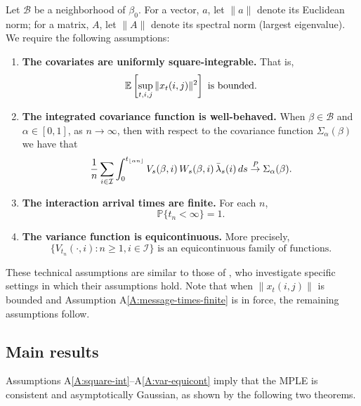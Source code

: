 \documentclass[final]{statsoc}
\begin{document}
Let $\mathcal{B}$ be a neighborhood of $\beta_0$.  For a vector, $a$, let
$\| a \|$ denote its Euclidean norm; for a matrix, $A$, let $\| A \|$ denote
its spectral norm (largest eigenvalue).  We require the following assumptions:
\begin{enumerate}[{A}1.]
    \item \label{A:square-int}
    \textbf{The covariates are uniformly square-integrable.}  That is,
    \[
        \mathbb{E}\left[
            \sup_{t, i, j} \| x_{t}(i,j) \|^2
        \right]
        \,\,\text{is bounded.}
    \]

    \item \label{A:integrated-cov-limit}
    \textbf{The integrated covariance function is well-behaved.}
    When $\beta \in \mathcal{B}$ and $\alpha \in [0,1]$, as $ n \to \infty$, then with respect to the covariance function $\Sigma_\alpha(\beta)$ we have that
    \[
        \frac{1}{n}
        \sum_{i \in \mathcal{I}}
        \int_0^{t_{\lfloor \alpha n \rfloor}}
            V_s(\beta,i)
            \, W_s(\beta,i)
            \, \bar \lambda_s(i)
            \, ds
        \overset{\mathit{P}}{\to}
        \Sigma_\alpha(\beta).
    \]

    \item \label{A:message-times-finite}
    \textbf{The interaction arrival times are finite.}  For each $n$,
    \[
        \mathbb{P}\{t_n < \infty\} = 1.
    \]

    \item \label{A:var-equicont}
    \textbf{The variance function is equicontinuous.}
    More precisely,
    \[
        \Big\{
            V_{t_n}(\cdot, i)
            :
            n \geq 1, i \in \mathcal{I}
        \Big\}
        \,\,\text{is an equicontinuous family of functions.}
    \]
\end{enumerate}

These technical assumptions are similar to those of
\citet{andersen1982cox}, who investigate specific settings in which their
assumptions hold.  Note that when $\| x_t(i,j) \|$ is bounded and Assumption
A\ref{A:message-times-finite} is in force, the remaining assumptions follow.

\subsection{Main results}
Assumptions A\ref{A:square-int}--A\ref{A:var-equicont} imply that the MPLE is consistent and asymptotically
Gaussian, as shown by the following two theorems.
\end{document}
